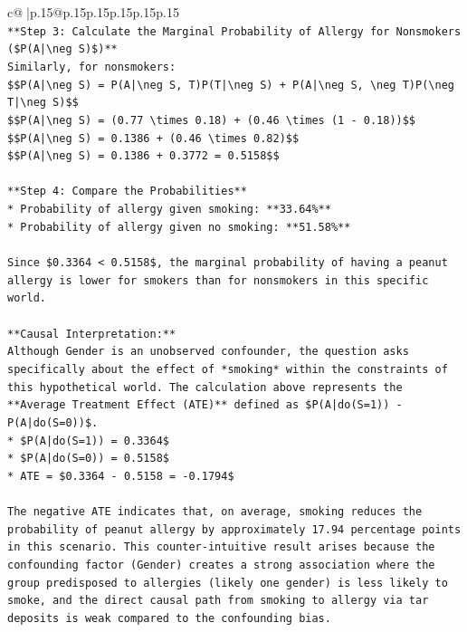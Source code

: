\documentclass{article}
\begin{document}
{\begin{supertabular}{c@{$\;$}|p{.15\linewidth}@{}p{.15\linewidth}p{.15\linewidth}p{.15\linewidth}p{.15\linewidth}p{.15\linewidth}}
{{{\\ 
\texttt{**Step 3: Calculate the Marginal Probability of Allergy for Nonsmokers (\$P(A|\textbackslash{}neg S)\$)**} \\
\texttt{Similarly, for nonsmokers:} \\
\texttt{\$\$P(A|\textbackslash{}neg S) = P(A|\textbackslash{}neg S, T)P(T|\textbackslash{}neg S) + P(A|\textbackslash{}neg S, \textbackslash{}neg T)P(\textbackslash{}neg T|\textbackslash{}neg S)\$\$} \\
\texttt{\$\$P(A|\textbackslash{}neg S) = (0.77 \textbackslash{}times 0.18) + (0.46 \textbackslash{}times (1 {-} 0.18))\$\$} \\
\texttt{\$\$P(A|\textbackslash{}neg S) = 0.1386 + (0.46 \textbackslash{}times 0.82)\$\$} \\
\texttt{\$\$P(A|\textbackslash{}neg S) = 0.1386 + 0.3772 = 0.5158\$\$} \\
\\ 
\texttt{**Step 4: Compare the Probabilities**} \\
\texttt{*   Probability of allergy given smoking: **33.64\%**} \\
\texttt{*   Probability of allergy given no smoking: **51.58\%**} \\
\\ 
\texttt{Since \$0.3364 < 0.5158\$, the marginal probability of having a peanut allergy is lower for smokers than for nonsmokers in this specific world.} \\
\\ 
\texttt{**Causal Interpretation:**} \\
\texttt{Although Gender is an unobserved confounder, the question asks specifically about the effect of *smoking* within the constraints of this hypothetical world. The calculation above represents the **Average Treatment Effect (ATE)** defined as \$P(A|do(S=1)) {-} P(A|do(S=0))\$.} \\
\texttt{*   \$P(A|do(S=1)) = 0.3364\$} \\
\texttt{*   \$P(A|do(S=0)) = 0.5158\$} \\
\texttt{*   ATE = \$0.3364 {-} 0.5158 = {-}0.1794\$} \\
\\ 
\texttt{The negative ATE indicates that, on average, smoking reduces the probability of peanut allergy by approximately 17.94 percentage points in this scenario. This counter{-}intuitive result arises because the confounding factor (Gender) creates a strong association where the group predisposed to allergies (likely one gender) is less likely to smoke, and the direct causal path from smoking to allergy via tar deposits is weak compared to the confounding bias.} \\
}}}
\end{supertabular}}
\end{document}
